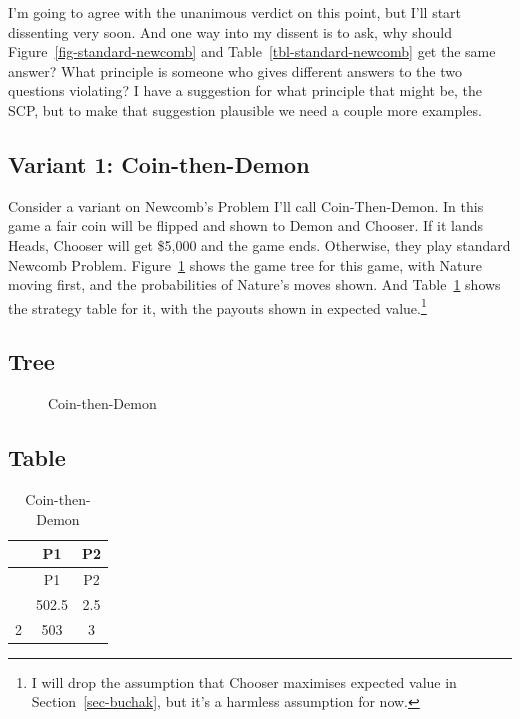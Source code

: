\documentclass[
  10pt,
  letterpaper,
  DIV=11,
  numbers=noendperiod,
  twoside]{scrartcl}
\begin{document}
I'm going to agree with the unanimous verdict on this point, but I'll
start dissenting very soon. And one way into my dissent is to ask, why
should Figure~\ref{fig-standard-newcomb} and
Table~\ref{tbl-standard-newcomb} get the same answer? What principle is
someone who gives different answers to the two questions violating? I
have a suggestion for what principle that might be, the SCP, but to make
that suggestion plausible we need a couple more examples.

\subsection{Variant 1: Coin-then-Demon}\label{variant-1-coin-then-demon}

Consider a variant on Newcomb's Problem I'll call Coin-Then-Demon. In
this game a fair coin will be flipped and shown to Demon and Chooser. If
it lands Heads, Chooser will get \$5,000 and the game ends. Otherwise,
they play standard Newcomb Problem. Figure~\ref{fig-coin-then-demon}
shows the game tree for this game, with Nature moving first, and the
probabilities of Nature's moves shown. And
Table~\ref{tbl-coin-then-demon} shows the strategy table for it, with
the payouts shown in expected value.\footnote{I will drop the assumption
  that Chooser maximises expected value in Section~\ref{sec-buchak}, but
  it's a harmless assumption for now.}

\subsection{Tree}

\begin{figure}


\caption{\label{fig-coin-then-demon}Coin-then-Demon}

\end{figure}%

\subsection{Table}

\begin{longtable}[]{@{}ccc@{}}
\caption{Coin-then-Demon}\label{tbl-coin-then-demon}\tabularnewline
\toprule\noalign{}
& P1 & P2 \\
\midrule\noalign{}
\endfirsthead
\toprule\noalign{}
& P1 & P2 \\
\midrule\noalign{}
\endhead
\bottomrule\noalign{}
\endlastfoot
1 & 502.5 & 2.5 \\
2 & 503 & 3 \\
\end{longtable}
\end{document}
